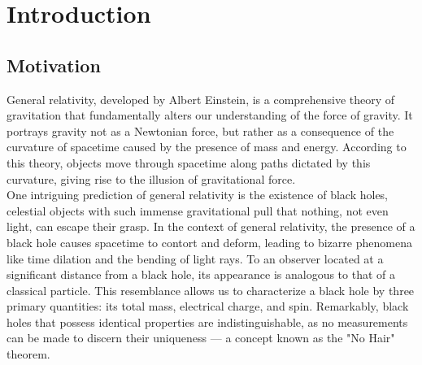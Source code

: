 
\chapter{Introduction}
\label{chapter:introduction}

\section{Motivation}
\label{section:motivation}

General relativity, developed by Albert Einstein, is a comprehensive theory of gravitation that fundamentally alters our understanding of the force of gravity. It portrays gravity not as a Newtonian force, but rather as a consequence of the curvature of spacetime caused by the presence of mass and energy. According to this theory, objects move through spacetime along paths dictated by this curvature, giving rise to the illusion of gravitational force. \\

One intriguing prediction of general relativity is the existence of black holes, celestial objects with such immense gravitational pull that nothing, not even light, can escape their grasp. In the context of general relativity, the presence of a black hole causes spacetime to contort and deform, leading to bizarre phenomena like time dilation and the bending of light rays. To an observer located at a significant distance from a black hole, its appearance is analogous to that of a classical particle. This resemblance allows us to characterize a black hole by three primary quantities: its total mass, electrical charge, and spin. Remarkably, black holes that possess identical properties are indistinguishable, as no measurements can be made to discern their uniqueness \cite{HawMalStr16} — a concept known as the "No Hair" theorem. \\

